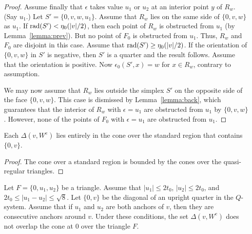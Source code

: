 \begin{proof}
Assume finally that $\epsilon$ takes value $u_1$ or $u_2$ at an
interior point $y$ of  $R_w$. (Say $u_1$.)     Let
$S'=\{0,v,w,u_1\}$. Assume that $R_w$ lies on the same side of
$\{0,v,w\}$ as $u_1$.  If $\operatorname{rad}(S') < \eta_0(|v|/2)$, then each
point of $R_w$ is obstructed from $u_1$ (by
Lemma~\ref{lemma:prev}).  But no point of $F_0$ is obstructed from
$u_1$.  Thus, $R_w$ and $F_0$ are disjoint in this case.  Assume
that $\operatorname{rad}(S') \ge \eta_0(|v|/2)$.  If the orientation of
$\{0,v,w\}$ in $S'$ is negative, then $S'$ is a quarter and the
result follows.  Assume that the orientation is positive.  Now
$\epsilon_0(S',x) = w$ for $x\in R_w$, contrary to assumption.

We may now assume that $R_w$ lies outside the simplex $S'$ on the
opposite side of the face $\{0,v,w\}$. This case is dismissed by
Lemma~\ref{lemma:back}, which guarantees that the interior of
$R_w$ with $\epsilon=u_1$ are obstructed from $u_1$ by
$\{0,v,w\}$.  However, none of the points of $F_0$ with
$\epsilon=u_1$ are obstructed from $u_1$.
\end{proof}

\begin{corollary}
Each $\Delta(v,W^e)$ lies entirely in the cone over the standard
region that contains $\{0,v\}$.
\end{corollary}

\begin{proof}
The cone over a standard region is bounded by the cones  over the
quasi-regular triangles.
\end{proof}




\begin{lemma}\label{lemma:delta-flat}
Let $F=\{0,u_1,u_2\}$ be a triangle.  Assume that $|u_1|\le 2t_0$,
$|u_2|\le 2t_0$, and $2t_0\le|u_1-u_2|\le\sqrt8$.  Let $\{0,v\}$
be the diagonal of an upright quarter in the $Q$-system.  Assume
that if $u_1$ and $u_2$ are both anchors of $v$, then they are
consecutive anchors around $v$. Under these conditions, the set
$\Delta(v,W^e)$ does not overlap the cone at $0$ over the triangle
$F$.
\end{lemma}

